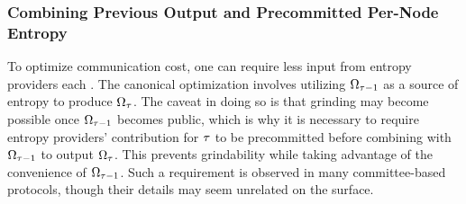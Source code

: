 \subsubsection{Combining Previous Output and Precommitted Per-Node Entropy}
\label{subsubsection:precommitted}
To optimize communication cost, one can require less input from entropy providers each \epoch. The canonical optimization involves utilizing $\Omega_{\tau - 1}$ as a source of entropy to produce $\Omega_\tau$. The caveat in doing so is that grinding may become possible once $\Omega_{\tau - 1}$ becomes public, which is why it is necessary to require entropy providers' contribution for \epoch $\tau$ to be precommitted before combining with $\Omega_{\tau - 1}$ to output $\Omega_\tau$. This prevents grindability while taking advantage of the convenience of $\Omega_{\tau - 1}$. Such a requirement is observed in many committee-based protocols, though their details may seem unrelated on the surface.
